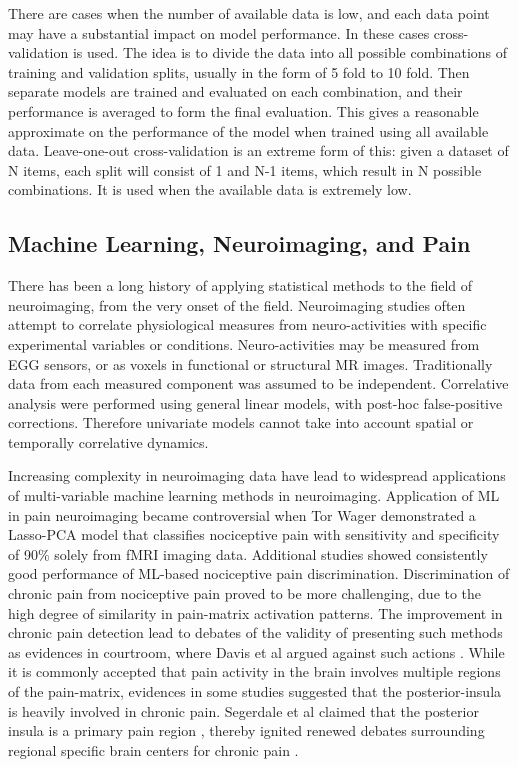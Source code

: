 There are cases when the number of available data is low, and each data point may have a substantial impact on model performance. In these cases cross-validation is used. The idea is to divide the data into all possible combinations of training and validation splits, usually in the form of 5 fold to 10 fold. Then separate models are trained and evaluated on each combination, and their performance is averaged to form the final evaluation. This gives a reasonable approximate on the performance of the model when trained using all available data. Leave-one-out cross-validation is an extreme form of this: given a dataset of N items, each split will consist of 1 and N-1 items, which result in N possible combinations. It is used when the available data is extremely low. 
 
\subsection{Machine Learning, Neuroimaging, and Pain}

There has been a long history of applying statistical methods to the field of neuroimaging, from the very onset of the field. Neuroimaging studies often attempt to correlate physiological measures from neuro-activities with specific experimental variables or conditions. Neuro-activities may be measured from EGG sensors, or as voxels in functional or structural MR images. Traditionally data from each measured component was assumed to be independent. Correlative analysis were performed using general linear models, with post-hoc false-positive corrections. Therefore univariate models cannot take into account spatial or temporally correlative dynamics. 

Increasing complexity in neuroimaging data have lead to widespread applications of multi-variable machine learning methods in neuroimaging. Application of ML in pain neuroimaging became controversial when Tor Wager \cite{Wager2013} demonstrated a Lasso-PCA model that classifies nociceptive pain with sensitivity and specificity of 90\% solely from fMRI imaging data. Additional studies showed consistently good performance of ML-based nociceptive pain discrimination. Discrimination of chronic pain from nociceptive pain proved to be more challenging, due to the high degree of similarity in pain-matrix activation patterns. The improvement in chronic pain detection lead to debates of the validity of presenting such methods as evidences in courtroom, where Davis et al argued against such actions \cite{Davis2012a}. While it is commonly accepted that pain activity in the brain involves multiple regions of the pain-matrix, evidences in some studies suggested that the posterior-insula is heavily involved in chronic pain. Segerdale et al claimed that the posterior insula is a primary pain region \cite{Segerdahl2015a}, thereby ignited renewed debates surrounding regional specific brain centers for chronic pain \cite{Davis2015}.

